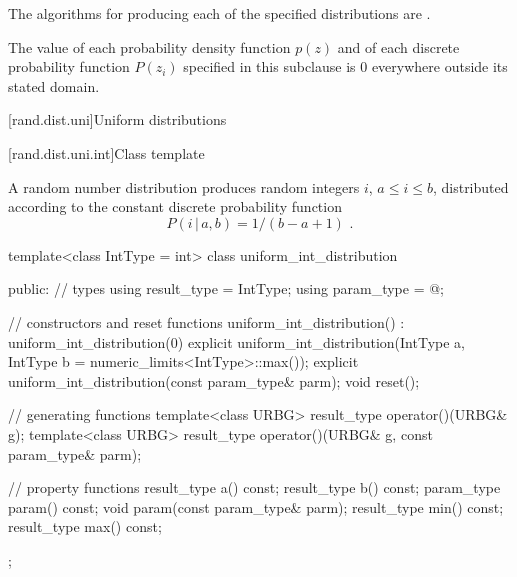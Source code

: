 \pnum
The algorithms for producing each
of the specified distributions are
.

\pnum
The value of each probability density function $p(z)$
and of each discrete probability function $P(z_i)$
specified in this subclause
is $0$
everywhere outside its stated domain.


[rand.dist.uni]{Uniform distributions}%
%


[rand.dist.uni.int]{Class template }%
%
%

\pnum
A  random number distribution
produces random integers $i$,
$a \leq i \leq b$,
distributed according to
the constant discrete probability function%
%
%
\[  P(i\,|\,a,b) = 1 / (b - a + 1) \text{ .} \]

%
%
\begin{codeblock}
template<class IntType = int>
  class uniform_int_distribution {
  public:
    // types
    using result_type = IntType;
    using param_type  = @\unspec@;

    // constructors and reset functions
    uniform_int_distribution() : uniform_int_distribution(0) {}
    explicit uniform_int_distribution(IntType a, IntType b = numeric_limits<IntType>::max());
    explicit uniform_int_distribution(const param_type& parm);
    void reset();

    // generating functions
    template<class URBG>
      result_type operator()(URBG& g);
    template<class URBG>
      result_type operator()(URBG& g, const param_type& parm);

    // property functions
    result_type a() const;
    result_type b() const;
    param_type param() const;
    void param(const param_type& parm);
    result_type min() const;
    result_type max() const;
  };
\end{codeblock}


